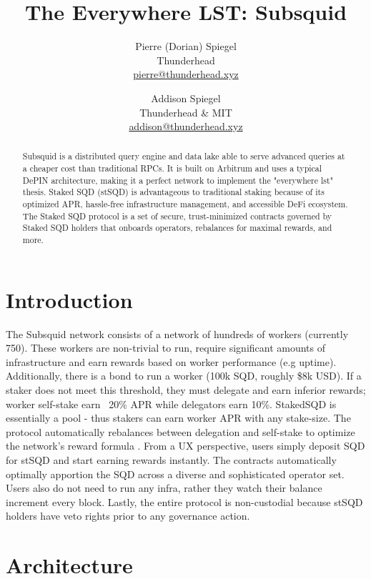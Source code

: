 \documentclass{article}
\title{The Everywhere LST: Subsquid}
\author{
    Pierre (Dorian) Spiegel \\ Thunderhead \\ \href{mailto:pierre@thunderhead.xyz}{pierre@thunderhead.xyz} \\
    \and
    Addison Spiegel \\ Thunderhead \& MIT \\ \href{mailto:addison@thunderhead.xyz}{addison@thunderhead.xyz}
}
\begin{document}
\date{}
\maketitle
\begin{abstract}
    Subsquid is a distributed query engine and data lake able to serve advanced queries at a cheaper cost than traditional RPCs. It is built on Arbitrum and uses a typical DePIN architecture, making it a perfect network to implement the "everywhere lst" thesis. Staked SQD (stSQD) is advantageous to traditional staking because of its optimized APR, hassle-free infrastructure management, and accessible DeFi ecosystem. The Staked SQD protocol is a set of secure, trust-minimized contracts governed by Staked SQD holders that onboards operators, rebalances for maximal rewards, and more. 
\end{abstract}
\section{Introduction}
The Subsquid network consists of a network of hundreds of workers (currently 750). These workers are non-trivial to run, require significant amounts of infrastructure and earn rewards based on worker performance (e.g uptime). Additionally, there is a bond to run a worker (100k SQD, roughly \$8k USD). If a staker does not meet this threshold, they must delegate and earn inferior rewards; worker self-stake earn ~20\% APR while delegators earn 10\%. StakedSQD is essentially a pool - thus stakers can earn worker APR with any stake-size. The protocol automatically rebalances between delegation and self-stake to optimize the network's reward formula \cite{subsquid-rewards}. From a UX perspective, users simply deposit SQD for stSQD and start earning rewards instantly. The contracts automatically optimally apportion the SQD across a diverse and sophisticated operator set. Users also do not need to run any infra, rather they watch their balance increment every block. Lastly, the entire protocol is non-custodial because stSQD holders have veto rights prior to any governance action.
\section{Architecture}
\end{document}
